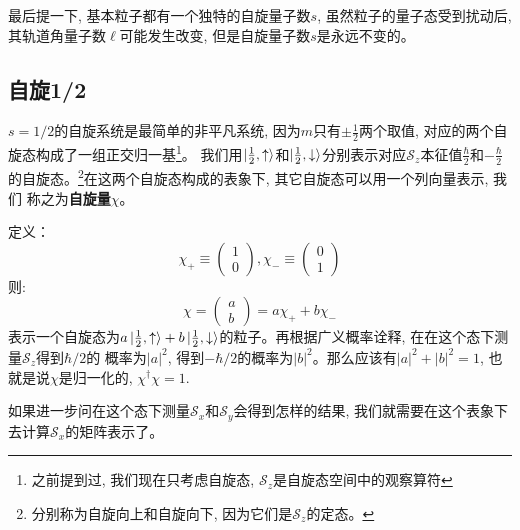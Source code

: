 \documentclass[a4paper,zihao=-4,linespread=1]{ctexrep}
\begin{document}
    最后提一下, 基本粒子都有一个独特的自旋量子数$s$, 虽然粒子的量子态受到扰动后, 其轨道角量子数$\ell$可能发生改变, 但是自旋量子数$s$是永远不变的。

    \subsection{自旋1/2}
    $s=1/2$的自旋系统是最简单的非平凡系统, 因为$m$只有$\pm\frac{1}{2}$两个取值, 对应的两个自旋态构成了一组正交归一基\footnote{之前提到过, 我们现在只考虑自旋态, $\mathcal{S}_z$是自旋态空间中的观察算符}。
    我们用$\ket{\frac{1}{2}, \uparrow}$和$\ket{\frac{1}{2},\downarrow}$分别表示对应$\mathcal{S}_z$本征值$\frac{\hbar}{2}$和$-\frac{\hbar}{2}$的自旋态。\footnote{分别称为自旋向上和自旋向下, 因为它们是$\mathcal{S}_z$的定态。}在这两个自旋态构成的表象下, 其它自旋态可以用一个列向量表示, 我们
    称之为\textbf{自旋量}$\chi$。

    定义：
    \begin{equation}
        \chi_+\equiv\begin{pmatrix}
            1\\0
        \end{pmatrix},\chi_-\equiv\begin{pmatrix}
            0\\1
        \end{pmatrix}
    \end{equation}
    则:
    \begin{equation}
        \chi =\begin{pmatrix}
            a\\b
        \end{pmatrix}=a\chi_++b\chi_-
    \end{equation}
    表示一个自旋态为$a\ket{\frac{1}{2},\uparrow}+b\ket{\frac{1}{2},\downarrow}$的粒子。再根据广义概率诠释, 在在这个态下测量$\mathcal{S}_z$得到$\hbar/2$的
    概率为$|a|^2$, 得到$-\hbar/2$的概率为$|b|^2$。那么应该有$|a|^2+|b|^2=1$, 也就是说$\chi $是归一化的, $\chi^\dagger\chi=1$.

    如果进一步问在这个态下测量$\mathcal{S}_x$和$\mathcal{S}_y$会得到怎样的结果, 我们就需要在这个表象下去计算$\mathcal{S}_x$的矩阵表示了。
\end{document}
